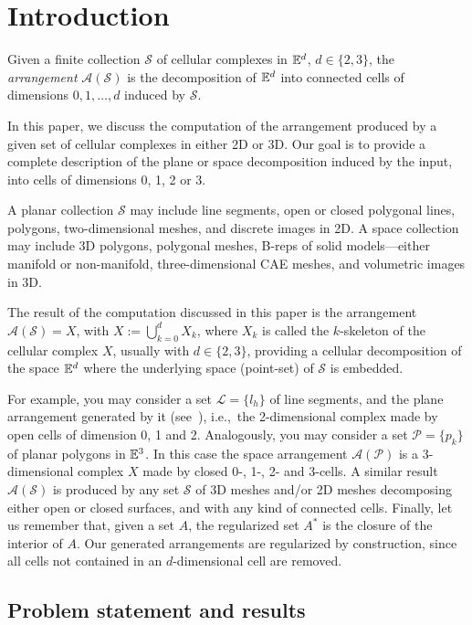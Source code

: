 
\section{Introduction}\label{introduction}

Given a finite collection $\mathcal{S}$ of cellular complexes in $\mathbb{E}^d$,
$d \in \{2,3\}$, the \emph{arrangement} $\mathcal{A}(\mathcal{S})$ is the
decomposition of $\mathbb{E}^d$ into connected cells of dimensions
$0, 1, \ldots, d$ induced by $\mathcal{S}$.

In this paper, we discuss the computation of the arrangement produced by
a given set of cellular complexes in either 2D or 3D. Our goal is to provide a
complete description of the plane or space decomposition induced by the
input, into cells of dimensions 0, 1, 2 or 3.

A planar collection $\mathcal{S}$ may include line segments, open or closed
polygonal lines, polygons, two-dimensional meshes, and discrete images
in 2D. A space collection may include 3D polygons, polygonal meshes, B-reps of solid models---either
manifold or non-manifold, three-di\-men\-sional CAE meshes, and volumetric
images in 3D.

The result of the computation discussed in this paper is the arrangement
$\mathcal{A}(\mathcal{S}) = X$, with $X := \bigcup_{k=0}^d$$X_k$, where $X_k$ is called the $k$-skeleton of the cellular complex $X$,  usually with
$d \in \{ 2,3 \}$, providing a cellular
decomposition of the space $\mathbb{E}^d$ where the {underlying space} (point-set) of $\mathcal{S}$ is embedded.

For example, you may consider a set {$\mathcal{L} = \{l_h\}$ of line
segments}, and the plane
arrangement generated by it (see~\cite{Chazelle:1993:CFA:165062.165181}), 
i.e.,~the 2-dimensional complex made by
open cells of dimension 0, 1 and 2. 
Analogously, you may consider a
set {$\mathcal{P} = \{p_k\}$ of planar polygons} in
$\mathbb{E}^3$. In this case the space arrangement
$\mathcal{A}(\mathcal{P})$ is a 3-dimensional complex $X$ made by closed 0-,
1-, 2- and 3-cells. A similar result $\mathcal{A}(\mathcal{S})$ is produced by any set $\mathcal{S}$ of 3D meshes and/or 2D meshes decomposing either open or closed surfaces, and with any kind of connected cells. {Finally,} {let us remember that, given a set $A$, the regularized set $A^*$ is the closure of the interior of $A$. Our generated arrangements are regularized by construction, since all cells not contained in an $d$-dimensional cell are removed. }

\subsection{Problem statement and results}

